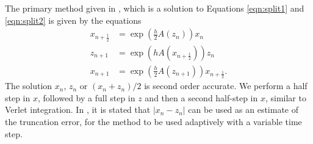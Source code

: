 The primary method given in \cite{blanes_pos_2022}, which is a solution to Equations \ref{eqn:split1} and \ref{eqn:split2} is given by the equations
\begin{equation}
    \begin{aligned}
        x_{n+\frac{1}{2}} &= \exp \left( \frac{h}{2} A(z_n) \right) x_n \\
        z_{n+1} &= \exp \left( h A(x_{n+\frac{1}{2}}) \right) z_n \\
        x_{n+1} &= \exp \left( \frac{h}{2} A(z_{n+1}) \right) x_{n+\frac{1}{2}}.
    \end{aligned}
    \label{eqn:secondorderstrangsplittingmethod}
\end{equation}
The solution $x_n$, $z_n$ or $(x_n + z_n)/2$ is second order accurate. We perform a half step in $x$,
followed by a full step in $z$ and then a second half-step in $x$, similar to Verlet integration.
In \cite{blanes_pos_2022}, it is stated that $|x_n - z_n|$ can be used as an estimate of the truncation error, for the method to be used adaptively with a variable time step. 

